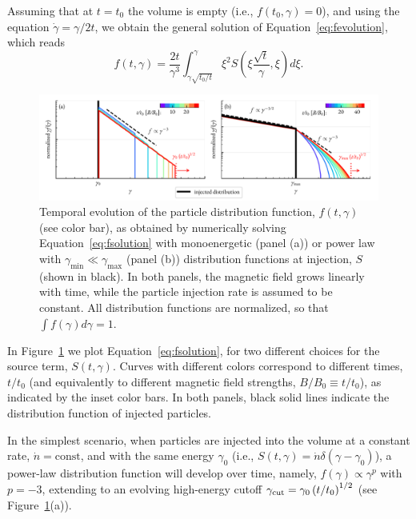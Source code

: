 Assuming that at $t=t_0$ the volume is empty (i.e., $f(t_0,\gamma)=0$), and using the equation $\dot{\gamma}=\gamma/2t$, we obtain the general solution of Equation~\eqref{eq:fevolution}, which reads
\begin{equation}
    \label{eq:fsolution}
    f(t,\gamma)=\frac{2t}{\gamma^3}\int_{\gamma\sqrt{t_0/t}}^{\gamma}\xi^2 S\left(\xi\frac{\sqrt{t}}{\gamma},\xi\right)d\xi.
\end{equation}

\begin{figure}[tb]
    \includegraphics[width=\textwidth]{figures/ch2-reconnection/fig2.pdf}
    \caption{Temporal evolution of the particle distribution function, $f(t, \gamma)$ (see color bar), as obtained by numerically solving Equation~\eqref{eq:fsolution} with monoenergetic (panel (a)) or power law with $\gamma_{\min} \ll \gamma_{\max}$ (panel (b)) distribution functions at injection, $S$ (shown in black). In both panels, the magnetic field grows linearly with time, while the particle injection rate is assumed to be constant. All distribution functions are normalized, so that $\int f(\gamma)d\gamma = 1$. }
    \label{fig:rec-theory}
\end{figure}

In Figure~\ref{fig:rec-theory} we plot Equation~\eqref{eq:fsolution}, for two different choices for the source term, $S(t,\gamma)$. Curves with different colors correspond to different times, $t/t_0$ (and equivalently to different magnetic field strengths, $B/B_0\equiv t/t_0$), as indicated by the inset color bars. In both panels, black solid lines indicate the distribution function of injected particles.

In the simplest scenario, when particles are injected into the volume at a constant rate, $\dot{n}=\mathrm{const}$, and with the same energy $\gamma_0$ (i.e., $S(t, \gamma)=\dot{n}\delta(\gamma - \gamma_0)$), a power-law distribution function  will develop over time, namely, $f(\gamma)\propto \gamma^{p}$ with $p=-3$, extending to an evolving high-energy cutoff $\gamma_{\rm cut}=\gamma_0\left(t/t_0\right)^{1/2}$ (see Figure~\ref{fig:rec-theory}(a)). 

